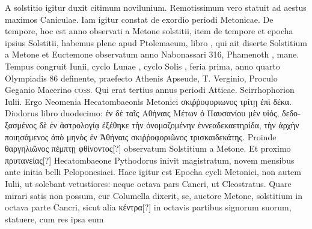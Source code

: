 A solstitio igitur duxit citimum novilunium.
Remotissimum vero
statuit ad aestus maximos Caniculae.
Iam igitur constat de exordio periodi
Metonicae.
De tempore, hoc est anno observati a Metone solstitii,
item de tempore et epocha ipsius Solstitii, habemus plene apud
Ptolemaeum, libro ,
 qui ait diserte Solstitium a Metone et Euctemone
observatum anno Nabonassari 316, Phamenoth , mane.
Tempus congruit  Iunii, cyclo Lunae ,
 cyclo Solis , feria
prima, anno quarto Olympiadis 86 definente, praefecto Athenis
Apseude, T. Verginio, Proculo Geganio Macerino \textsc{coss}.
Qui erat
tertius annus periodi Atticae.
Scirrhophorion  Iulii.
Ergo Neomenia
Hecatombaeonis Metonici \textgreek{σκιῤῥοφοριωνος τρίτῃ ἐπὶ δέκα}.
Diodorus
libro duodecimo:
 \textgreek{ἐν δὲ ταῖς Αθήναις Μέτων ὁ Παυσανίου μὲν υἱός,
δεδοξασμένος δὲ ἐν ἀστρολογίᾳ ἐξέθηκε τὴν ὀνομαζομένην ἐννεαδεκαετηρίδα,
τὴν ἀρχὴν ποιησάμενος ἀπὸ μηνὸς ἐν Ἀθήναις σκιῤῥοφοριῶνος τρισκαιδεκάτης.}
Proinde \textgreek{θαργηλιῶνος πέμπτῃ φθίνοντος[?]}
 observatum Solstitium
a Metone.
Et proximo \textgreek{πρυτανείας[?]} Hecatombaeone Pythodorus
inivit magistratum, novem mensibus ante initia belli Peloponesiaci.
Haec igitur est Epocha cycli Metonici, non autem  Iulii,
ut solebant vetustiores: neque octava pars Cancri, ut Cleostratus.
Quare mirari satis non possum, cur Columella dixerit, se, auctore
Metone, solstitium in octava parte Cancri, sicut alia \textgreek{κέντρα[?]}
in octavis partibus signorum suorum, statuere, cum res ipsa eum
